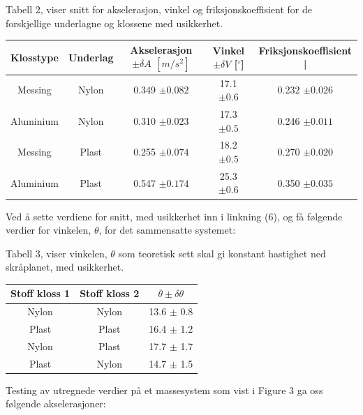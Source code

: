 \documentclass[10pt,a4paper]{report}
\begin{document}
\begin{center}
 \begin{tablenotes}
 	\small
 	\item Tabell 2, viser snitt for akselerasjon, vinkel og friksjonskoeffisient for de forskjellige underlagne og klossene med usikkerhet.
 	\end{tablenotes}
  \begin{tabular}{| c | c | c | c | c |}
    \hline
    Klosstype & Underlag & Akselerasjon $\pm \delta A$ $[m/s^2]$ & Vinkel $\pm \delta V$ [$^{\circ}$] & Friksjonskoeffisient | \\ \hline
    Messing & Nylon & 0.349 $\pm 0.082$ & 17.1 $\pm 0.6$ & 0.232 $\pm 0.026$ \\ \hline
    Aluminium & Nylon & 0.310 $\pm 0.023$ & 17.3 $\pm 0.5$ & 0.246 $\pm 0.011$\\ \hline
    Messing & Plast & 0.255 $\pm 0.074$ & 18.2 $\pm 0.5$ & 0.270 $\pm 0.020$\\ \hline
    Aluminium & Plast & 0.547 $\pm 0.174$ & 25.3 $\pm 0.6$ & 0.350 $\pm 0.035$\\ \hline
  \end{tabular}
\end{center}

Ved å sette verdiene for snitt, med usikkerhet inn i linkning (6), og få følgende verdier for vinkelen, $\theta$, for det sammensatte systemet:

\begin{center}
     \begin{tablenotes}
 	\small
 	\item Tabell 3, viser vinkelen, $\theta$ som teoretisk sett skal gi konstant hastighet ned skråplanet, med usikkerhet.
 	\end{tablenotes}
  \begin{tabular}{| c | c | c |}
    \hline
    Stoff kloss 1 & Stoff kloss 2 & $\overline{\theta} \pm \delta\theta$ \\ \hline
    Nylon & Nylon & 13.6 $\pm$ 0.8 \\ \hline
    Plast & Plast & 16.4 $\pm$ 1.2 \\ \hline
    Nylon & Plast & 17.7 $\pm$ 1.7 \\ \hline
    Plast & Nylon & 14.7 $\pm$ 1.5  \\ \hline
  \end{tabular}
\end{center}
Testing av utregnede verdier på et massesystem som vist i Figure 3 ga oss følgende akselerasjoner:
\end{document}
